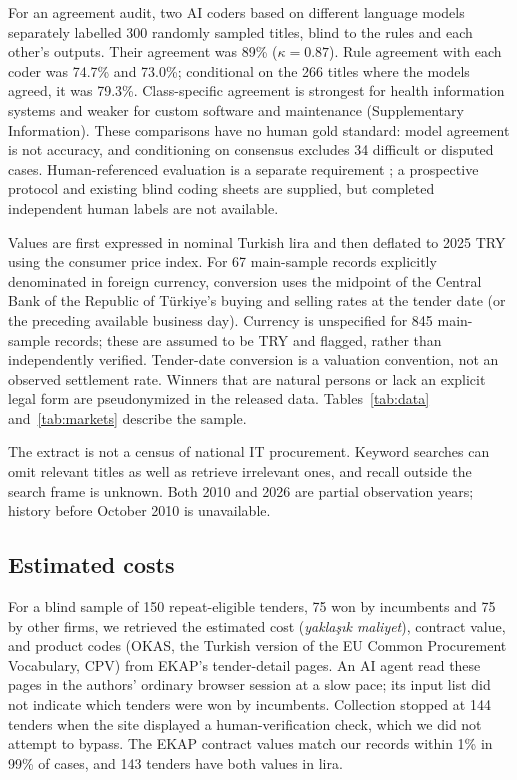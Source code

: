 \documentclass[pdflatex,sn-apa]{sn-jnl}
\begin{document}
For an agreement audit, two AI coders based on different language models separately labelled 300 randomly sampled titles, blind to the rules and each other's outputs. Their agreement was 89\% ($\kappa=0.87$). Rule agreement with each coder was 74.7\% and 73.0\%; conditional on the 266 titles where the models agreed, it was 79.3\%. Class-specific agreement is strongest for health information systems and weaker for custom software and maintenance (Supplementary Information). These comparisons have no human gold standard: model agreement is not accuracy, and conditioning on consensus excludes 34 difficult or disputed cases. Human-referenced evaluation is a separate requirement \citep{Calderon2025}; a prospective protocol and existing blind coding sheets are supplied, but completed independent human labels are not available.


Values are first expressed in nominal Turkish lira and then deflated to 2025 TRY using the consumer price index. For 67 main-sample records explicitly denominated in foreign currency, conversion uses the midpoint of the Central Bank of the Republic of Türkiye's buying and selling rates at the tender date (or the preceding available business day). Currency is unspecified for 845 main-sample records; these are assumed to be TRY and flagged, rather than independently verified. Tender-date conversion is a valuation convention, not an observed settlement rate. Winners that are natural persons or lack an explicit legal form are pseudonymized in the released data. Tables~\ref{tab:data} and~\ref{tab:markets} describe the sample.

The extract is not a census of national IT procurement. Keyword searches can omit relevant titles as well as retrieve irrelevant ones, and recall outside the search frame is unknown. Both 2010 and 2026 are partial observation years; history before October 2010 is unavailable.

\subsection{Estimated costs}
For a blind sample of 150 repeat-eligible tenders, 75 won by incumbents and 75 by other firms, we retrieved the estimated cost (\emph{yaklaşık maliyet}), contract value, and product codes (OKAS, the Turkish version of the EU Common Procurement Vocabulary, CPV) from EKAP's tender-detail pages. An AI agent read these pages in the authors' ordinary browser session at a slow pace; its input list did not indicate which tenders were won by incumbents. Collection stopped at 144 tenders when the site displayed a human-verification check, which we did not attempt to bypass. The EKAP contract values match our records within 1\% in 99\% of cases, and 143 tenders have both values in lira.
\end{document}
